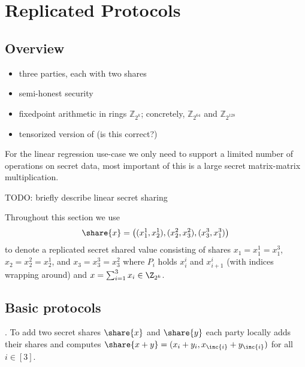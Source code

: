 \section{Replicated Protocols}


\subsection{Overview}

\begin{itemize}
    \item three parties, each with two shares
    \item semi-honest security
    \item fixedpoint arithmetic in rings $\mathbb{Z}_{2^{k}}$; concretely, $\mathbb{Z}_{2^{64}}$ and $\mathbb{Z}_{2^{128}}$
    \item tensorized version of \cite{CCS:AFLNO16} (is this correct?)
\end{itemize}

For the linear regression use-case we only need to support a limited number of
operations on secret data, most important of this is a large secret matrix-matrix
multiplication.

TODO: briefly describe linear secret sharing

Throughout this section we use 
$$
\share{x} = \big((x_1^1, x_2^1), (x_2^2, x_3^2), (x_3^3, x_1^3)\big)
$$ to denote a replicated secret shared value consisting of shares $x_1 = x_1^1 = x_1^3$, $x_2 = x_2^2 = x_2^1$, and $x_3 = x_3^3 = x_3^2$ where $P_i$ holds $x_i^i$ and $x_{i+1}^i$ (with indices wrapping around) and $x = \sum_{i=1}^3 x_i \in \Z_{2^k}$. 

\subsection{Basic protocols}
. To add two secret shares $\share{x}$ and $\share{y}$
each party locally adds their shares and computes $\share{x+y} =
(x_i + y_i, x_{\inc{i}} + y_{\inc{i}})$ for all $i \in [3]$.

